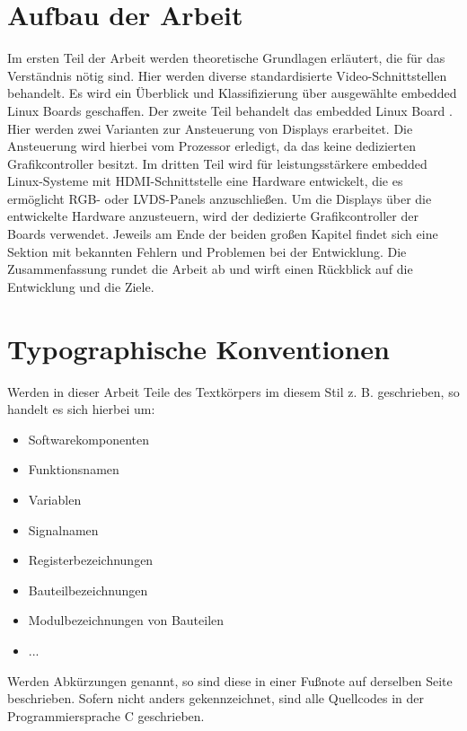 \section{Aufbau der Arbeit}
Im ersten Teil der Arbeit werden theoretische Grundlagen erläutert, die für das Verständnis nötig sind. Hier werden diverse standardisierte Video-Schnittstellen behandelt. Es wird ein Überblick und Klassifizierung über ausgewählte embedded Linux Boards geschaffen.
Der zweite Teil behandelt das embedded Linux Board . Hier werden zwei Varianten zur Ansteuerung von Displays erarbeitet. Die Ansteuerung wird hierbei vom Prozessor erledigt, da das  keine dedizierten Grafikcontroller besitzt.
Im dritten Teil wird für leistungsstärkere embedded Linux-Systeme mit HDMI-Schnittstelle eine Hardware entwickelt, die es ermöglicht RGB- oder LVDS-Panels anzuschließen. Um die Displays über die entwickelte Hardware anzusteuern, wird der dedizierte Grafikcontroller der Boards verwendet. Jeweils am Ende der beiden großen Kapitel findet sich eine Sektion mit bekannten Fehlern und Problemen bei der Entwicklung. Die Zusammenfassung rundet die Arbeit ab und wirft einen Rückblick auf die Entwicklung und die Ziele.

\section{Typographische Konventionen}
Werden in dieser Arbeit Teile des Textkörpers im diesem Stil z. B.  geschrieben, so handelt es sich hierbei um:
\begin{itemize}
\item Softwarekomponenten
\item Funktionsnamen
\item Variablen
\item Signalnamen
\item Registerbezeichnungen
\item Bauteilbezeichnungen
\item Modulbezeichnungen von Bauteilen
\item ...
\end{itemize}
Werden Abkürzungen genannt, so sind diese in einer Fußnote auf derselben Seite beschrieben.
Sofern nicht anders gekennzeichnet, sind alle Quellcodes in der Programmiersprache C geschrieben.
